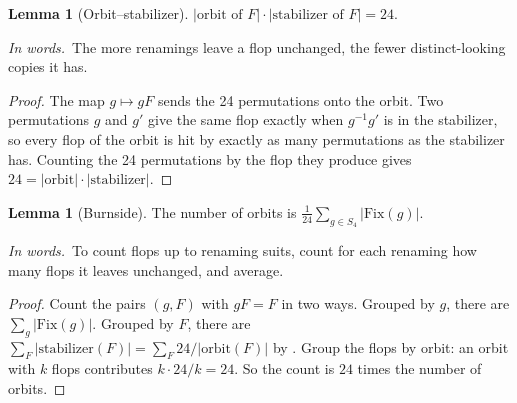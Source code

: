 \documentclass[11pt]{article}
\theoremstyle{definition}
\newtheorem{lemma}[definition]{Lemma}
\newcommand{\inwords}{\par\smallskip\noindent\textit{In words.}\ }
\begin{document}
\begin{lemma}[Orbit--stabilizer]\label{lem:orbstab}
$|\text{orbit of }F|\cdot|\text{stabilizer of }F|=24$.
\inwords The more renamings leave a flop unchanged, the fewer distinct-looking copies it has.
\end{lemma}
\begin{proof}
The map $g\mapsto gF$ sends the 24 permutations onto the orbit. Two permutations $g$ and $g'$ give the same flop exactly
when $g^{-1}g'$ is in the stabilizer, so every flop of the orbit is hit by exactly as many permutations as the stabilizer
has. Counting the 24 permutations by the flop they produce gives $24=|\text{orbit}|\cdot|\text{stabilizer}|$.
\end{proof}

\begin{lemma}[Burnside]\label{lem:burnside}
The number of orbits is $\frac1{24}\sum_{g\in S_4}|\mathrm{Fix}(g)|$.
\inwords To count flops up to renaming suits, count for each renaming how many flops it leaves unchanged, and average.
\end{lemma}
\begin{proof}
Count the pairs $(g,F)$ with $gF=F$ in two ways. Grouped by $g$, there are $\sum_g|\mathrm{Fix}(g)|$. Grouped by $F$, there are
$\sum_F|\text{stabilizer}(F)|=\sum_F24/|\text{orbit}(F)|$ by . Group the flops by orbit: an orbit with $k$ flops
contributes $k\cdot24/k=24$. So the count is $24$ times the number of orbits.
\end{proof}
\end{document}
